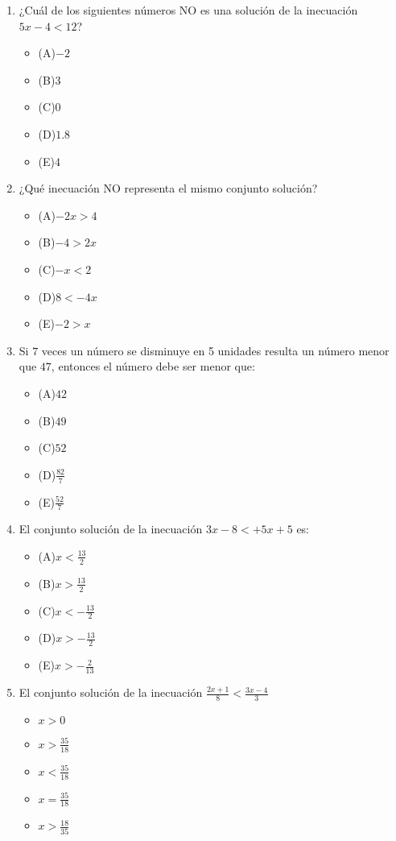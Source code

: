 \documentclass[]{book}
\theoremstyle{definition}
\theoremstyle{definition}
\theoremstyle{definition}
\theoremstyle{remark}
\begin{document}
\begin{enumerate}
	\item ¿Cuál de los siguientes números NO es una solución de la inecuación $5x-4<12$?
	
\begin{itemize}
	\item (A)$-2$
	\item (B)$3$
	\item (C)$0$
	\item (D)$1.8$
	\item (E)$4$
\end{itemize}
	\item ¿Qué inecuación NO representa el mismo conjunto solución?
	
\begin{itemize}
	\item (A)$-2x>4$
	\item (B)$-4>2x$
	\item (C)$-x<2$
	\item (D)$8<-4x$
	\item (E)$-2>x$
\end{itemize}
	\item Si $7$ veces un número se disminuye en 5 unidades resulta un número menor que $47$, entonces el número debe ser menor que:
	
\begin{itemize}
	\item (A)$42$
	\item (B)$49$
	\item (C)$52$
	\item (D)$\frac{82}{7}$
	\item (E)$\frac{52}{7}$
\end{itemize}
	\item El conjunto solución de la inecuación $3x-8<+5x+5$ es:
	
\begin{itemize}
	\item (A)$x<\frac{13}{2}$
	\item (B)$x>\frac{13}{2}$
	\item (C)$x<-\frac{13}{2}$
	\item (D)$x>-\frac{13}{2}$
	\item (E)$x>-\frac{2}{13}$
\end{itemize}
  \item El conjunto solución de la inecuación $\frac{2x+1}{8}<\frac{3x-4}{3}$
  
\begin{itemize}
	\item $x>0$
	\item $x>\frac{35}{18}$
	\item $x<\frac{35}{18}$
	\item $x=\frac{35}{18}$
	\item $x>\frac{18}{35}$
\end{itemize}
\end{enumerate}
\end{document}
